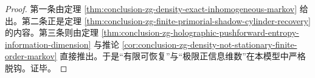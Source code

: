 \begin{proof}
第一条由定理
\ref{thm:conclusion-zg-density-exact-inhomogeneous-markov}
给出。第二条正是定理
\ref{thm:conclusion-zg-finite-primorial-shadow-cylinder-recovery}
的内容。第三条则由定理
\ref{thm:conclusion-zg-holographic-pushforward-entropy-information-dimension}
与推论
\ref{cor:conclusion-zg-density-not-stationary-finite-order-markov}
直接推出。于是“有限可恢复”与“极限正信息维数”在本模型中严格脱钩。证毕。
\end{proof}

\endinput

